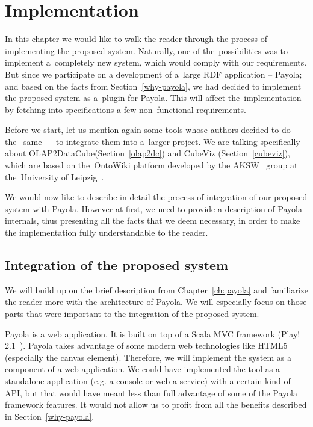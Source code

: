 \chapter{Implementation}
\label{ch:implementation}
In this chapter we would like to walk the reader through the process of implementing 
the proposed system. Naturally, one of the~possibilities was to implement a~completely new system, 
which would comply with our requirements. But since we participate on a development of a~large RDF
application -- Payola; and based on the facts from
Section~\ref{why-payola}, we had decided to implement the proposed system as a~plugin
for Payola. This will affect the~implementation by fetching into specifications a few non--functional
requirements.

Before we start, let us mention again some tools whose authors decided to do the~
same --- to integrate them into a~larger project. We are talking specifically about 
OLAP2DataCube(Section~\ref{olap2dc}) and CubeViz (Section~\ref{cubeviz}),
which are based on the~OntoWiki platform developed by 
the AKSW~\cite{aksw} group at the~University of Leipzig~\cite{leipzich-uni}.

We would now like to describe in detail the process of integration of our proposed system with
Payola. However at first, we need to provide a description of Payola internals, thus presenting all
the facts that we deem necessary, in order to make the implementation fully understandable to
the reader.

\section{Integration of the proposed system}
We will build up on the brief description from Chapter~\ref{ch:payola} and familiarize the reader
more with the architecture of Payola. We will especially
focus on those parts that were important to the integration of the proposed system.

Payola is a web application. It is built on top of a Scala MVC framework (Play! 2.1~\cite{playfw}).
Payola takes advantage of
some modern web technologies like HTML5 (especially the canvas element).
Therefore, we will implement the system as a component of a web application.
We could have implemented the tool as a standalone 
application (e.g. a console or web a service) with a certain kind of API,
but that would have meant less than full advantage of some of the Payola framework features.
It would not allow us to profit from all the benefits described in Section~\ref{why-payola}. 

